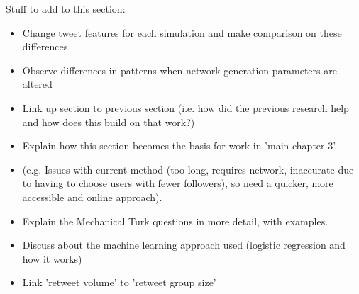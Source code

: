 Stuff to add to this section:
\begin{itemize}
\item Change tweet features for each simulation and make comparison on these differences
\item Observe differences in patterns when network generation parameters are altered
\item Link up section to previous section (i.e. how did the previous research help and how does this build on that work?)
\item Explain how this section becomes the basis for work in 'main chapter 3'.
\item (e.g. Issues with current method (too long, requires network, inaccurate due to having to choose users with fewer followers), so need a quicker, more accessible and online approach).
\item Explain the Mechanical Turk questions in more detail, with examples.
\item Discuss about the machine learning approach used (logistic regression and how it works)
\item Link 'retweet volume' to 'retweet group size'
\end{itemize}

